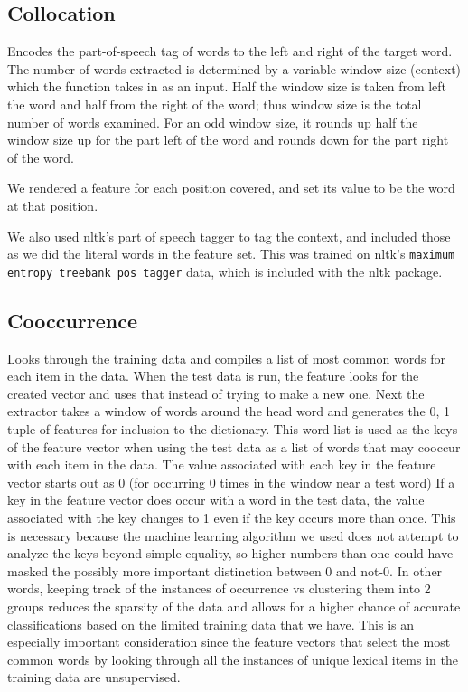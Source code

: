 \documentclass{article}
\begin{document}
\subsection{Collocation}

Encodes the part-of-speech tag of words to the left and right of the target word. The number of words extracted is determined by a variable window size (context) which the function takes in as an input. Half the window size is taken from left the word and half from the right of the word; thus window size is the total number of words examined. For an odd window size, it rounds up half the window size up for the part left of the word and rounds down for the part right of the word.

We rendered a feature for each position covered, and set its value to be the word at that position.

We also used nltk's part of speech tagger to tag the context, and included those as we did the literal words in the feature set.  This was trained on nltk's \verb+maximum entropy treebank pos tagger+ data, which is included with the nltk package.

\subsection{Cooccurrence}
Looks through the training data and compiles a list of most common words for each item in the data. When the test data is run, the feature looks for the created vector and uses that instead of trying to make a new one. Next the extractor takes a window of words around the head word and generates the 0, 1 tuple of features for inclusion to the dictionary. This word list is used as the keys of the feature vector when using the test data as a list of words that may cooccur with each item in the data. The value associated with each key in the feature vector starts out as 0 (for occurring 0 times in the window near a test word) If a key in the feature vector does occur with a word in the test data, the value associated with the key changes to 1 even if the key occurs more than once.  This is necessary because the machine learning algorithm we used does not attempt to analyze the keys beyond simple equality, so higher numbers than one could have masked the possibly more important distinction between 0 and not-0. In other words, keeping track of the instances of occurrence vs clustering them into 2 groups reduces the sparsity of the data and allows for a higher chance of accurate classifications based on the limited training data that we have. This is an especially important consideration since the feature vectors that select the most common words by looking through all the instances of unique lexical items in the training data are unsupervised.
\end{document}
